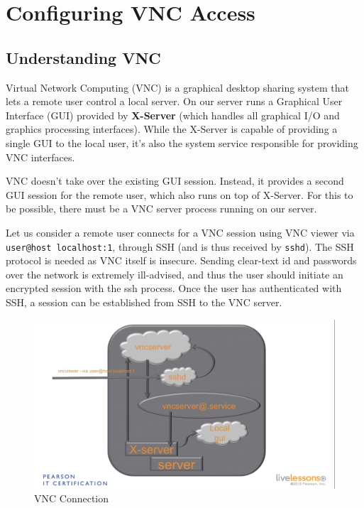 \chapter{Configuring VNC Access}

\section{Understanding VNC}
Virtual Network Computing (VNC) is a graphical desktop sharing system that lets a remote user control a local server. On our server runs a Graphical User Interface (GUI) provided by \textbf{X-Server} (which handles all graphical I/O and graphics processing interfaces). While the X-Server is capable of providing a single GUI to the local user, it's also the system service responsible for providing VNC interfaces. 

VNC doesn't take over the existing GUI session. Instead, it provides a second GUI session for the remote user, which also runs on top of X-Server. For this to be possible, there must be a VNC server process running on our server. 

Let us consider a remote user connects for a VNC session using VNC viewer via \verb|user@host localhost:1|, through SSH (and is thus received by \verb|sshd|). The SSH protocol is needed as VNC itself is insecure. Sending clear-text id and passwords over the network is extremely ill-advised, and thus the user should initiate an encrypted session with the ssh process. Once the user has authenticated with SSH, a session can be established from SSH to the VNC server. 

\begin{figure}[H]
	\centering
	\includegraphics[width=0.9\linewidth]{RHCSA/Mod4/chapters/4.26.a}
	\caption{VNC Connection}
	\label{fig:4 VNC Connection}
\end{figure}


